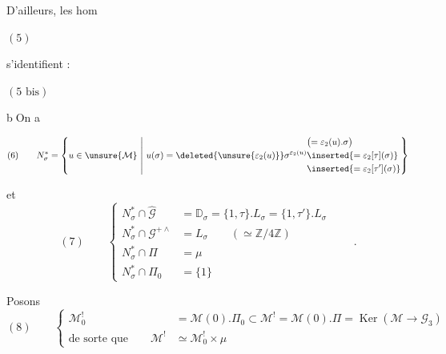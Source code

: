 D'ailleurs, les hom

\( (5) \)\quad
{}

s'identifient :

\( (5\text{ bis}) \)\quad
{}

\textcircled{b}\quad On a

\margin{$/$}
\[
(6)\qquad N_\sigma^*=
\left\{u\in\unsure{\mathcal M}\ \middle|\ u(\sigma)=\deleted{\unsure{\varepsilon_2(u)}}\sigma^{\varepsilon_2(u)}
\begin{aligned}
&\bigl(=\varepsilon_2(u).\sigma\bigr)\\
&\inserted{=\varepsilon_2[\tau](\sigma)}\\
&\inserted{=\varepsilon_2[\tau'](\sigma)}
\end{aligned}
\right\}
\]

 et
\[
(7)\qquad
\left\{\begin{aligned}
N_\sigma^*\cap\widehat{\mathcal G}
  &=\mathbb D_\sigma=\{1,\tau\}.L_\sigma=\{1,\tau'\}.L_\sigma\\
N_\sigma^*\cap\mathcal G^{+\wedge}
  &= L_\sigma\qquad(\simeq\mathbb Z/4\mathbb Z)\\
N_\sigma^*\cap\Pi&=\mu\\
N_\sigma^*\cap\Pi_0&=\{1\}
\end{aligned}\right.
\qquad .
\]


Posons
\[
(8)\qquad
\left\{\begin{aligned}
\mathcal M_0^!&=\mathcal M(0).\Pi_0
\subset\mathcal M^!=\mathcal M(0).\Pi
=\operatorname{Ker}(\mathcal M\to\mathcal G_3)\\
\text{de sorte que}\qquad
\mathcal M^!&\simeq\mathcal M_0^!\times\mu
\end{aligned}\right.
\]

